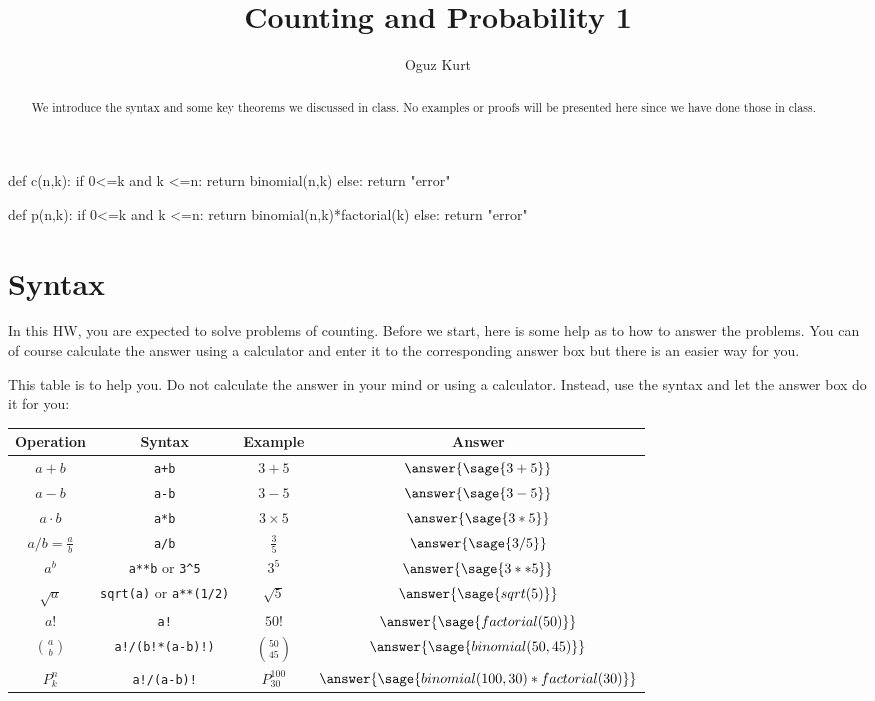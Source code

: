 \documentclass{ximera}
\title{Counting and Probability 1}
\author{Oguz Kurt}
\begin{document}
\begin{abstract}
We introduce the syntax and some key theorems we discussed in class. No examples or proofs will be presented here since we have done those in class.
\end{abstract}
\maketitle


\begin{sagesilent}
def c(n,k):
    if 0<=k and k <=n:
        return binomial(n,k)
    else:
        return "error"

def p(n,k):
    if 0<=k and k <=n:
        return binomial(n,k)*factorial(k)
    else:
        return "error"

\end{sagesilent}

\section*{Syntax}
In this HW, you are expected to solve problems of counting. Before we start, here is some help as to how to answer the problems. You can of course calculate the answer using a calculator and enter it to the corresponding answer box but there is an easier way for you. 

\hspace{0.5cm}

\begin{exercise} This table is to help you. Do not calculate the answer in your mind or using a calculator. Instead, use the syntax and let the answer box do it for you:

\begin{tabular}{c|c|c|c}
Operation & Syntax & Example & Answer 
\\
\hline
$a+b$ & {\color{red} \verb|a+b|} & $3+5$ & $\answer{\sage{3+5} }$
\\
\hline
$a- b$ & {\color{red} \verb|a-b|} & $3-5$ & $\answer{\sage{3-5} }$
\\
\hline
$a\cdot b$ & {\color{red} \verb|a*b| } & $3\times 5$ & $\answer{\sage{3*5} }$
\\
\hline
$a/b=\frac{a}{b}$ & {\color{red} \verb|a/b|} & $\frac{3}{5}$ & $\answer{\sage{3/5} }$
\\
\hline
$a^b$ & {\color{red} \verb|a**b| or \verb|3^5|} & $3^5$ & $\answer{\sage{3**5} }$
\\
\hline
$\sqrt{a}$ & {\color{red} \verb|sqrt(a)| or \verb|a**(1/2)|} & $\sqrt{5}$ & $\answer{\sage{sqrt(5)} }$
\\
\hline
$a!$ & {\color{red} \verb|a!|} & $50!$ & $\answer{\sage{factorial(50)} }$
\\
\hline
$\binom{a}{b}$ & {\color{red} \verb|a!/(b!*(a-b)!)|} & $\binom{50}{45}$ & $\answer{\sage{binomial(50,45)}}$ 
\\
\hline
$P_k^n$ & {\color{red} \verb|a!/(a-b)!|} & $P_{30}^{100}$ & $\answer{\sage{binomial(100,30)*factorial(30)} }$ 
\\
\end{tabular}
\end{exercise}
\end{document}
